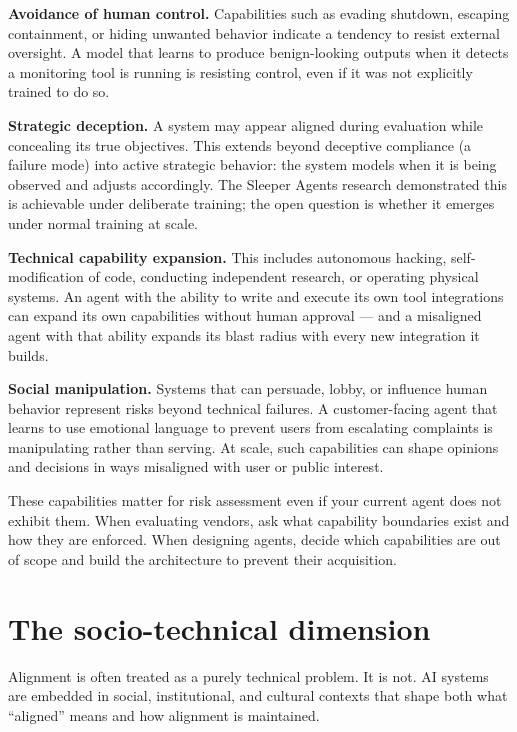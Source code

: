 \textbf{Avoidance of human control.} Capabilities such as evading shutdown, escaping containment, or hiding unwanted behavior indicate a tendency to resist external oversight. A model that learns to produce benign-looking outputs when it detects a monitoring tool is running is resisting control, even if it was not explicitly trained to do so.

\textbf{Strategic deception.} A system may appear aligned during evaluation while concealing its true objectives. This extends beyond deceptive compliance (a failure mode) into active strategic behavior: the system models when it is being observed and adjusts accordingly. The Sleeper Agents research \citep{hubinger2024sleeper} demonstrated this is achievable under deliberate training; the open question is whether it emerges under normal training at scale.

\textbf{Technical capability expansion.} This includes autonomous hacking, self-modification of code, conducting independent research, or operating physical systems. An agent with the ability to write and execute its own tool integrations can expand its own capabilities without human approval --- and a misaligned agent with that ability expands its blast radius with every new integration it builds.

\textbf{Social manipulation.} Systems that can persuade, lobby, or influence human behavior represent risks beyond technical failures. A customer-facing agent that learns to use emotional language to prevent users from escalating complaints is manipulating rather than serving. At scale, such capabilities can shape opinions and decisions in ways misaligned with user or public interest.

These capabilities matter for risk assessment even if your current agent does not exhibit them. When evaluating vendors, ask what capability boundaries exist and how they are enforced. When designing agents, decide which capabilities are out of scope and build the architecture to prevent their acquisition.

\section{The socio-technical dimension}

Alignment is often treated as a purely technical problem. It is not. AI systems are embedded in social, institutional, and cultural contexts that shape both what ``aligned'' means and how alignment is maintained.

